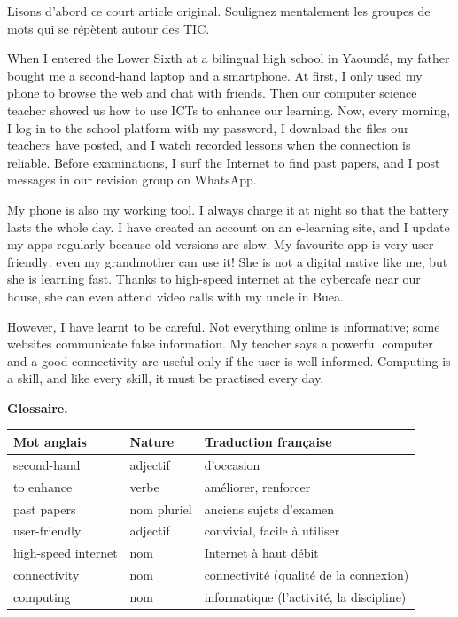 \documentclass[11pt]{article}
\newcounter{popsec}
\newcounter{popsub}
\newcommand{\courssub}[1]{%
  \stepcounter{popsub}%
  \par\vspace{9pt}\noindent{\popxbold\fontsize{11.5}{13}\selectfont\color{popink}{\color{poporange}\thepopsec.\thepopsub}\hspace{6pt}#1}\par\nopagebreak\vspace{4pt}
}
\begin{document}
\courssub{Observing the language: a short text}

Lisons d'abord ce court article original. Soulignez mentalement les groupes de mots qui se répètent autour des TIC.

\begin{textebox}
When I entered the Lower Sixth at a bilingual high school in Yaoundé, my father bought me a second-hand laptop and a smartphone. At first, I only used my phone to browse the web and chat with friends. Then our computer science teacher showed us how to use ICTs to enhance our learning. Now, every morning, I log in to the school platform with my password, I download the files our teachers have posted, and I watch recorded lessons when the connection is reliable. Before examinations, I surf the Internet to find past papers, and I post messages in our revision group on WhatsApp.

My phone is also my working tool. I always charge it at night so that the battery lasts the whole day. I have created an account on an e-learning site, and I update my apps regularly because old versions are slow. My favourite app is very user-friendly: even my grandmother can use it! She is not a digital native like me, but she is learning fast. Thanks to high-speed internet at the cybercafe near our house, she can even attend video calls with my uncle in Buea.

However, I have learnt to be careful. Not everything online is informative; some websites communicate false information. My teacher says a powerful computer and a good connectivity are useful only if the user is well informed. Computing is a skill, and like every skill, it must be practised every day.
\end{textebox}

\textbf{Glossaire.}

\begin{center}
\begin{tabularx}{\linewidth}{|l|l|X|}
\hline
\rowcolor{popblueL} \textbf{Mot anglais} & \textbf{Nature} & \textbf{Traduction française} \\
\hline
second-hand & adjectif & d'occasion \\
\hline
to enhance & verbe & améliorer, renforcer \\
\hline
past papers & nom pluriel & anciens sujets d'examen \\
\hline
user-friendly & adjectif & convivial, facile à utiliser \\
\hline
high-speed internet & nom & Internet à haut débit \\
\hline
connectivity & nom & connectivité (qualité de la connexion) \\
\hline
computing & nom & informatique (l'activité, la discipline) \\
\hline
\end{tabularx}
\end{center}
\end{document}
